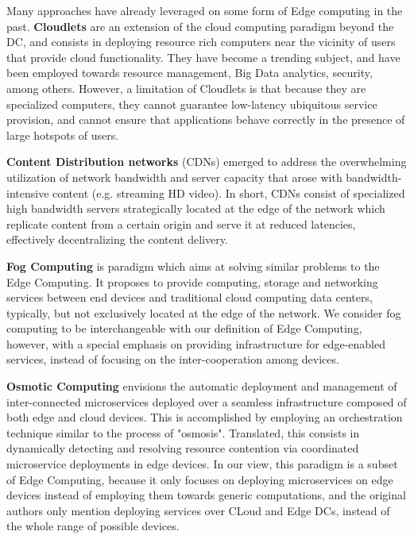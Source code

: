 Many approaches have already leveraged on some form of Edge computing in the past. \textbf{Cloudlets} \cite{10.1145/2307849.2307858} are an extension of the cloud computing paradigm beyond the DC, and consists in deploying resource rich computers near the vicinity of users that provide cloud functionality. They have become a trending subject, and have been employed towards resource management, Big Data analytics, security, among others. However, a limitation of Cloudlets is that because they are specialized computers, they cannot guarantee low-latency ubiquitous service provision, and cannot ensure that applications behave correctly in the presence of large hotspots of users. 

\textbf{Content Distribution networks} \cite{peng2004cdn} (CDNs) emerged to address the overwhelming utilization of network bandwidth and server capacity that arose with bandwidth-intensive content (e.g. streaming HD video). In short, CDNs consist of specialized high bandwidth servers strategically located at the edge of the network which replicate content from a certain origin and serve it at reduced latencies, effectively decentralizing the content delivery. 

\textbf{Fog Computing} \cite{bonomi2012fog} is paradigm which aims at solving similar problems to the Edge Computing. It proposes to provide computing, storage and networking services between end devices and traditional cloud computing data centers, typically, but not exclusively located at the edge of the network. We consider fog computing to be interchangeable with our definition of Edge Computing, however, with a special emphasis on providing infrastructure for edge-enabled services, instead of focusing on the inter-cooperation among devices.

\textbf{Osmotic Computing} \cite{villari2016osmotic} envisions the automatic deployment and management of inter-connected microservices deployed over a seamless infrastructure composed of both edge and cloud devices. This is accomplished by employing an orchestration technique similar to the process of "osmosis". Translated, this consists in dynamically detecting and resolving resource contention via coordinated microservice deployments in edge devices. In our view, this paradigm is a subset of Edge Computing, because it only focuses on deploying microservices on edge devices instead of employing them towards generic computations, and the original authors only mention deploying services over CLoud and Edge DCs, instead of the whole range of possible devices.


